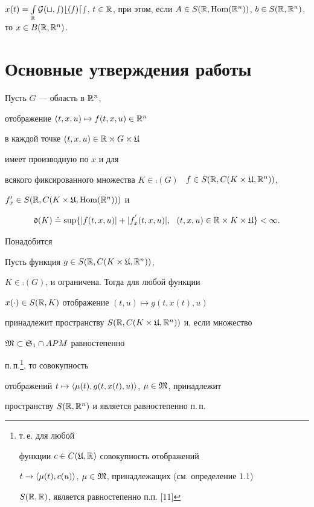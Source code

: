 $x(t)=\int\lt_{\R}\cal G(t,s)b(s)ds$, $t\in\R$, при этом, если $A\in


S(\R,\Hom(\R^{n}))$, $b\in S(\R,\R^{n})$, то $x\in B(\R,\R^{n})$.





\section{Основные утверждения работы}





Пусть $G$ --- область в $\Bbb R^{n}$,


отображение $(t,x,u)\mapsto f(t,x,u)\in\Bbb R^n$


в каждой точке $(t,x,u)\in\Bbb R\times G\times\frak U$


имеет производную по $x$ и для


всякого фиксированного множества $K\in \comp(G)$ \ $f\in


S(\R,C(K\times\frak U,\R^{n}))$,


$f'_{x}\in S(\Bbb R,C(K\times\frak U,\operatorname{Hom}(\Bbb R^{n})))$ и


\begin{equation}


\frak d(K)\doteq\sup\{|f(t,x,u)|+


|f_{x}^{'}(t,x,u)|,\ \ (t,x,u)\in\R\times K\times\frak U\}<\infty.


\end{equation}





Понадобится





\begin{lems}


Пусть функция $g\in S(\Bbb R,C(K\times\frak U,\Bbb R^{n}))$,


$K\in \comp(G)$, и ограничена. Тогда для любой функции


$x(\cdot)\in S(\Bbb R,K)$ отображение $(t,u)\mapsto g(t,x(t),u)$


принадлежит пространству $S(\Bbb R,C(K\times\frak U,\Bbb R^{n}))$ и, если множество


$\frak M\subset\frak S_{1}\cap {APM}$ равностепенно


п.\,п.\footnote{т.\,е. для любой


функции $c\in C(\frak U,\Bbb R)$ совокупность отображений


$t\to\langle\mu(t),c(u)\rangle$, $\mu\in\frak M$, принадлежащих (см. определение 1.1)


$S(\Bbb R,\Bbb R)$, является равностепенно п.п. [11]}, то совокупность


отображений $t\mapsto\langle\mu(t),g(t,x(t),u)\rangle$, $\mu\in\frak M$, принадлежит


пространству $S(\Bbb R,\Bbb R^{n})$ и является равностепенно п.\,п.


\end{lems}






